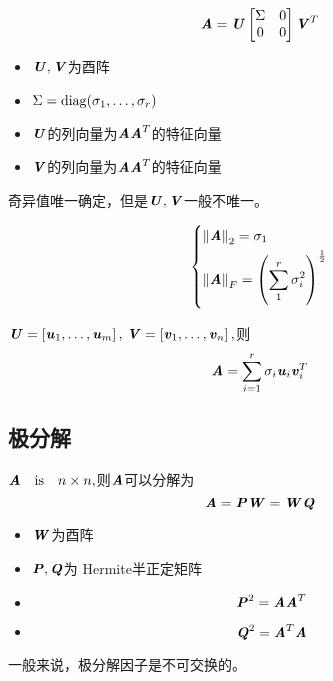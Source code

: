 \begin{theorem}
    \[
        \MA = \MU \begin{bmatrix}
            \Sigma  &   0 \\
            0       &   0
        \end{bmatrix} \MV^T
    \]

    \begin{itemize}
        \item $\MU, \MV$为酉阵
        \item $\Sigma = \diag(\sigma_1, \ldots, \sigma_r)$
    \end{itemize}
\end{theorem}

\begin{inference}
    \begin{itemize}
        \item $\MU$的列向量为$\MA\MA^T$的特征向量
        \item $\MV$的列向量为$\MA\MA^T$的特征向量
    \end{itemize}
    奇异值唯一确定，但是$\MU, \MV$一般不唯一。

    \[
        \begin{dcases}
            \norm{\MA}_2 = \sigma_1 \\
            \norm{\MA}_F = \left(\sum_1^r \sigma_i^2\right)^{\frac{1}{2}}
        \end{dcases}
    \]
\end{inference}

\begin{inference}
    $\MU = \left[\Vu_1, \ldots, \Vu_m\right],\, \MV = \left[\Vv_1, \ldots, \Vv_n\right],$则
    \[
        \MA = \sum_{i=1}^r \sigma_i \Vu_i\Vv_i^T
    \]
\end{inference}

\subsection{极分解}
\label{sub:极分解}

\begin{theorem}
    $\ann,$则$\MA$可以分解为
    \[
        \MA = \MP \MW = \MW \MQ
    \]

    \begin{itemize}
        \item $\MW$为酉阵
        \item $\MP, \MQ$为 Hermite半正定矩阵
        \item \[ \MP^2 = \MA \MA^T \]
        \item \[ \MQ^2 = \MA^T \MA \]
    \end{itemize}

    一般来说，极分解因子是不可交换的。
\end{theorem}

